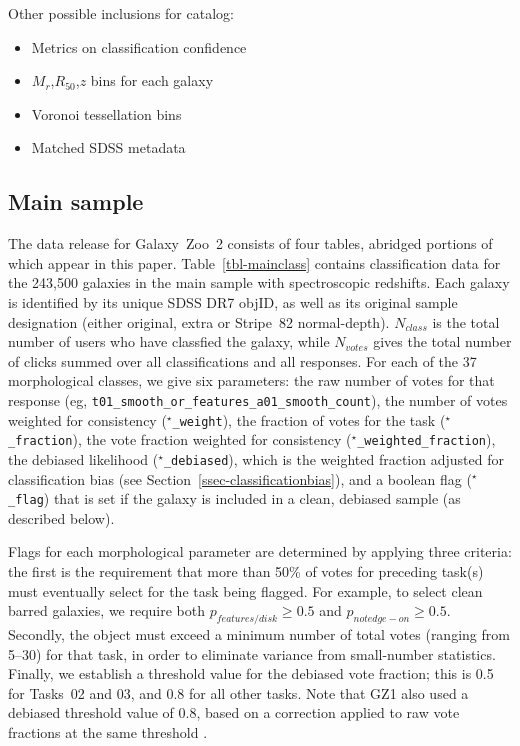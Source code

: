 \documentclass[useAMS,usenatbib]{mn2e}
\newcommand{\mr}{$M_r$}
\newcommand{\rfifty}{$R_{50}$}
\begin{document}
Other possible inclusions for catalog:
\begin{itemize}
	\item Metrics on classification confidence \citep[Table 04,][]{lin11}
	\item \mr,\rfifty,$z$ bins for each galaxy
	\item Voronoi tessellation bins
	\item Matched SDSS metadata
\end{itemize}

\subsection{Main sample}\label{ssec-catalog_main}

The data release for Galaxy~Zoo~2 consists of four tables, abridged portions of which appear in this paper. Table~\ref{tbl-mainclass} contains classification data for the 243,500 galaxies in the main sample with spectroscopic redshifts. Each galaxy is identified by its unique SDSS DR7 objID, as well as its original sample designation (either original, extra or Stripe~82 normal-depth). $N_{class}$ is the total number of users who have classfied the galaxy, while $N_{votes}$ gives the total number of clicks summed over all classifications and all responses. For each of the 37 morphological classes, we give six parameters: the raw number of votes for that response (eg, {\tt t01\_smooth\_or\_features\_a01\_smooth\_count}), the number of votes weighted for consistency ({\tt $^\star$\_weight}), the fraction of votes for the task ({\tt $^\star$\_fraction}), the vote fraction weighted for consistency ({\tt $^\star$\_weighted\_fraction}), the debiased likelihood ({\tt $^\star$\_debiased}), which is the weighted fraction adjusted for classification bias (see Section~\ref{ssec-classificationbias}), and a boolean flag ({\tt $^\star$\_flag}) that is set if the galaxy is included in a clean, debiased sample (as described below).

Flags for each morphological parameter are determined by applying three criteria: the first is the requirement that more than 50\% of votes for preceding task(s) must eventually select for the task being flagged. For example, to select clean barred galaxies, we require both $p_{features/disk}\geq0.5$ and $p_{not edge-on}\geq0.5$. Secondly, the object must exceed a minimum number of total votes (ranging from 5--30) for that task, in order to eliminate variance from small-number statistics. Finally, we establish a threshold value for the debiased vote fraction; this is 0.5 for Tasks~02 and 03, and 0.8 for all other tasks. Note that GZ1 also used a debiased threshold value of 0.8, based on a correction applied to raw vote fractions at the same threshold \citep{bam09,lin11}. 
\end{document}
